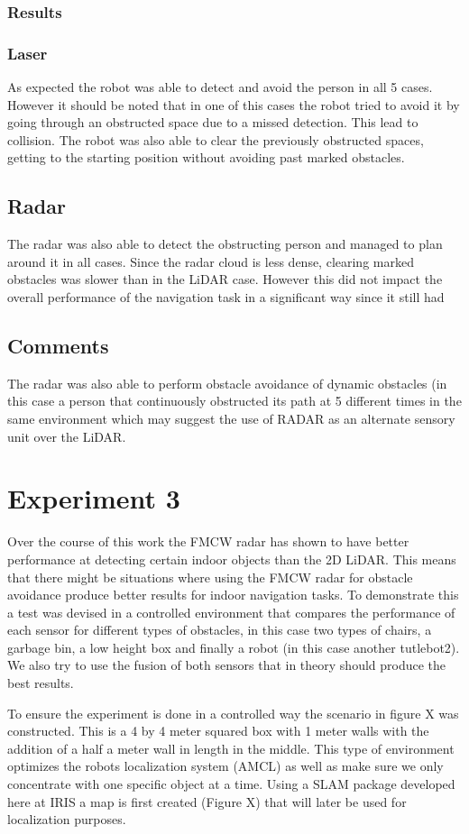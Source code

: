 \subsubsection{Results}
\subsubsection{Laser}
As expected the robot was able to detect and avoid the person in all 5 cases. However it should be noted that in one of this cases the robot tried to avoid it by going through an obstructed space due to a missed detection. This lead to collision. The robot was also able to clear the previously obstructed spaces, getting to the starting position without avoiding past marked obstacles.
\subsection{Radar}
The radar was also able to detect the obstructing person and managed to plan around it in all cases. Since the radar cloud is less dense, clearing marked obstacles was slower than in the \ac{LiDAR} case. However this did not impact the overall performance of the navigation task in a significant way since it still had 
\subsection{Comments}
 The radar was also able to perform 
obstacle avoidance of dynamic obstacles (in this case a person that continuously obstructed its path at 5 different times in the same environment which may suggest the use of \ac{RADAR} as an alternate sensory unit over the \ac{LiDAR}.
\section {Experiment 3}
Over the course of this work the \ac{FMCW} radar has shown to have better performance at detecting certain indoor objects than the 2D \ac{LiDAR}. This means that there might be situations where using the \ac{FMCW} radar for obstacle avoidance produce better results for indoor navigation tasks. To demonstrate this a test was devised in a controlled environment that compares the performance of each sensor for different types of obstacles, in this case two types of chairs, a garbage bin, a low height box and finally a robot (in this case another tutlebot2).  We also try to use the fusion of both sensors that in theory should produce the best results.


To ensure the experiment is done in a controlled way the scenario in figure X was constructed. This is a 4 by 4 meter squared box with 1 meter walls with the addition of a half a meter wall in length in the middle. This type of environment optimizes the robots localization system (\ac{AMCL}) as well as make sure we only concentrate with one specific object at a time. Using a \ac{SLAM} package developed here at \ac{IRIS} a map is first created (Figure X) that will later be used for localization purposes.

